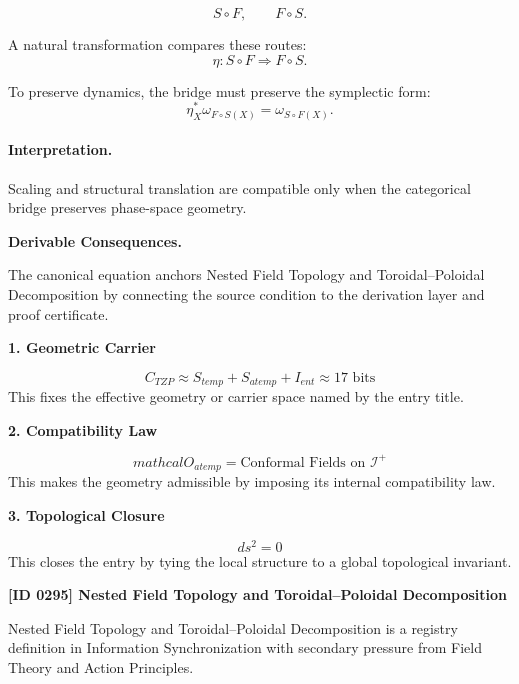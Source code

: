 \begin{equation}
S\circ F,
\qquad
F\circ S.
\end{equation}

A natural transformation compares these routes:
\begin{equation}
\eta:S\circ F\Rightarrow F\circ S.
\end{equation}

To preserve dynamics, the bridge must preserve the symplectic form:
\begin{equation}
\boxed{
\eta_X^{*}\omega_{F\circ S(X)}
=
\omega_{S\circ F(X)}.
}
\end{equation}

\paragraph{Interpretation.}
Scaling and structural translation are compatible only when the categorical bridge preserves phase-space geometry.

\par\vspace{0.35em}
\noindent\textbf{Derivable Consequences.}\quad
\begingroup
\footnotesize
\raggedright
The canonical equation anchors Nested Field Topology and Toroidal--Poloidal Decomposition by connecting the source condition to the derivation layer and proof certificate.
\par\endgroup

\noindent\textbf{1. Geometric Carrier}\par
\[
C_{TZP} \approx S_{temp} + S_{atemp} + I_{ent} \approx 17 \text{ bits}
\]
\noindent This fixes the effective geometry or carrier space named by the entry title.\par
\noindent\textbf{2. Compatibility Law}\par
\[
mathcal{O}_{atemp} = {\text{Conformal Fields on } \mathcal{I}^+}
\]
\noindent This makes the geometry admissible by imposing its internal compatibility law.\par
\noindent\textbf{3. Topological Closure}\par
\[
ds^2=0
\]
\noindent This closes the entry by tying the local structure to a global topological invariant.\par

\clearpage
\noindent\textbf{[ID 0295] Nested Field Topology and Toroidal--Poloidal Decomposition}\par
\vspace{0.35em}
\begingroup\small
{}
Nested Field Topology and Toroidal--Poloidal Decomposition is a registry definition in Information Synchronization with secondary pressure from Field Theory and Action Principles.

